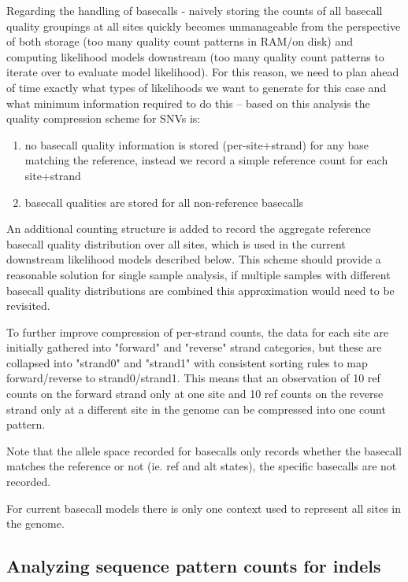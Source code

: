 \documentclass{article}
\begin{document}
Regarding the handling of basecalls - naively storing  the counts of all basecall quality groupings at all sites quickly becomes unmanageable from the perspective of both storage (too many quality count patterns in RAM/on disk) and computing likelihood models downstream (too many quality count patterns to iterate over to evaluate model likelihood). For this reason, we need to plan ahead of time exactly what types of likelihoods we want to generate for this case and what minimum information required to do this -- based on this analysis the quality compression scheme for SNVs is:

\begin{enumerate}
	\item no basecall quality information is stored (per-site+strand) for any base matching the reference, instead we record a simple reference count for each site+strand
	\item basecall qualities are stored for all non-reference basecalls
\end{enumerate}

An additional counting structure is added to record the aggregate reference basecall quality distribution over all sites, which is used in the current downstream likelihood models described below. This scheme should provide a reasonable solution for single sample analysis, if multiple samples with different basecall quality distributions are combined this approximation would need to be revisited.

To further improve compression of per-strand counts, the data for each site are initially gathered into "forward" and "reverse" strand categories, but these are collapsed into "strand0" and "strand1" with consistent sorting rules to map forward/reverse to strand0/strand1. This means that an observation of 10 ref counts on the forward strand only at one site and 10 ref counts on the reverse strand only at a different site in the genome can be compressed into one count pattern.

Note that the allele space recorded for basecalls only records whether the basecall matches the reference or not (ie. ref and alt states), the specific basecalls are not recorded.

For current basecall models there is only one context used to represent all sites in the genome.

\subsection{Analyzing sequence pattern counts for indels}
\end{document}
